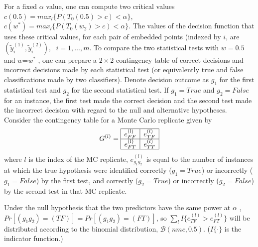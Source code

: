 \documentclass[11pt]{article} %
\begin{document}
For a fixed $\alpha$ value, one can compute two critical values $c(0.5)=max_l \{  P(T_0(0.5)>c)<\alpha\}$,  $c(w^*)=max_l \{  P(T_0(w_2)>c)<\alpha\}$. The values of the decision function that uses these critical  values, for each pair of embedded points (indexed by $i$, are  $(\tilde{y}_i^{(1)},\tilde{y}_i^{(2)}),\hspace{7pt}i=1,\ldots,m$. To compare the  two statistical tests with  $w=0.5$ and $w$=$w^*$  , one can prepare a $2\times 2$ contingency-table of correct decisions and incorrect decisions made by each statistical test (or equivalently true and false classifications made by two classifiers). Denote decision outcome as $g_1$ for the first statistical test and $g_2$ for the second statistical test. If $g_1=True$ and $g_2=False$ for an instance,  the first test made the correct decision and the second test made the incorrect decision with regard to the null and alternative hypotheses.
Consider the contingency table for a Monte Carlo replicate given by $$G^{(l)}= \begin{array}{|c|c|}
      \hline
       e_{FF}^{(l)} & e_{TF}^{(l)}\\
      \hline
       e_{FT}^{(l)} & e_{TT}^{(l)}\\
      \hline
      \end{array}      $$  where $l$ is the index of the MC replicate, $e_{g_1g_2}^{(l)}$ is equal to the number of instances at which the true hypothesis were identified  correctly ($g_1=True$) or incorrectly ($g_1=False$) by the first test, and correctly ($g_2=True$) or incorrectly ($g_2=False$) by the second test in that MC replicate.

Under the null  hypothesis that the two predictors have the same power at $\alpha$ ,
 $Pr[\left(g_1g_2\right)=(TF)]=Pr[\left(g_1g_2\right)=(FT)]$, so $\sum_l{I \{e_{TF}^{(l)}>e_{FT}^{(l)}\}}$ will be distributed according to  the binomial distribution, $\mathcal{B}(nmc,0.5)$. ($I\{\cdot\}$ is the indicator function.) 

\end{document}
